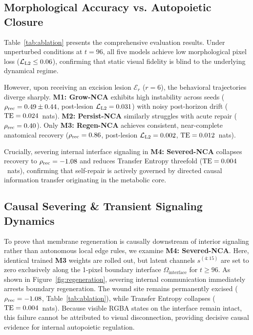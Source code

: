 \documentclass[10pt,twocolumn]{article}
\begin{document}
\subsection{Morphological Accuracy vs. Autopoietic Closure}

Table~\ref{tab:ablation} presents the comprehensive evaluation results. Under unperturbed conditions at $t=96$, all five models achieve low morphological pixel loss ($\mathcal{L}_{\text{L2}} \le 0.06$), confirming that static visual fidelity is blind to the underlying dynamical regime.

However, upon receiving an excision lesion $\mathcal{E}_r$ ($r=6$), the behavioral trajectories diverge sharply. \textbf{M1: Grow-NCA} exhibits high instability across seeds ($\rho_{\text{rec}} = 0.49 \pm 0.44$, post-lesion $\mathcal{L}_{\text{L2}} = 0.031$) with noisy post-horizon drift ($\text{TE} = 0.024$~nats). \textbf{M2: Persist-NCA} similarly struggles with acute repair ($\rho_{\text{rec}} = 0.40$). Only \textbf{M3: Regen-NCA} achieves consistent, near-complete anatomical recovery ($\rho_{\text{rec}} = 0.86$, post-lesion $\mathcal{L}_{\text{L2}} = 0.002$, $\text{TE} = 0.012$~nats).

Crucially, severing internal interface signaling in \textbf{M4: Severed-NCA} collapses recovery to $\rho_{\text{rec}} = -1.08$ and reduces Transfer Entropy threefold ($\text{TE} = 0.004$~nats), confirming that self-repair is actively governed by directed causal information transfer originating in the metabolic core.

\subsection{Causal Severing \& Transient Signaling Dynamics}

To prove that membrane regeneration is causally downstream of interior signaling rather than autonomous local edge rules, we examine \textbf{M4: Severed-NCA}. Here, identical trained \textbf{M3} weights are rolled out, but latent channels $s^{(4:15)}$ are set to zero exclusively along the 1-pixel boundary interface $\Omega_{\text{interface}}$ for $t \ge 96$. As shown in Figure~\ref{fig:regeneration}, severing internal communication immediately arrests boundary regeneration. The wound site remains permanently excised ($\rho_{\text{rec}} = -1.08$, Table~\ref{tab:ablation}), while Transfer Entropy collapses ($\text{TE} = 0.004$~nats). Because visible RGBA states on the interface remain intact, this failure cannot be attributed to visual disconnection, providing decisive causal evidence for internal autopoietic regulation.
\end{document}
